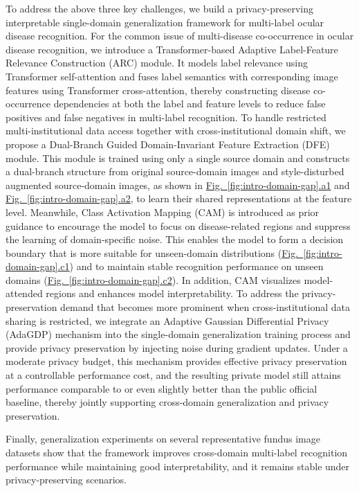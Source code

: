 To address the above three key challenges, we build a privacy-preserving interpretable single-domain generalization framework for multi-label ocular disease recognition. For the common issue of multi-disease co-occurrence in ocular disease recognition, we introduce a Transformer-based Adaptive Label-Feature Relevance Construction (ARC) module. It models label relevance using Transformer self-attention and fuses label semantics with corresponding image features using Transformer cross-attention, thereby constructing disease co-occurrence dependencies at both the label and feature levels to reduce false positives and false negatives in multi-label recognition. To handle restricted multi-institutional data access together with cross-institutional domain shift, we propose a Dual-Branch Guided Domain-Invariant Feature Extraction (DFE) module. This module is trained using only a single source domain and constructs a dual-branch structure from original source-domain images and style-disturbed augmented source-domain images, as shown in \hyperref[fig:intro-domain-gap]{Fig.~\ref*{fig:intro-domain-gap}.a1} and \hyperref[fig:intro-domain-gap]{Fig.~\ref*{fig:intro-domain-gap}.a2}, to learn their shared representations at the feature level. Meanwhile, Class Activation Mapping (CAM) is introduced as prior guidance to encourage the model to focus on disease-related regions and suppress the learning of domain-specific noise. This enables the model to form a decision boundary that is more suitable for unseen-domain distributions (\hyperref[fig:intro-domain-gap]{Fig.~\ref*{fig:intro-domain-gap}.c1}) and to maintain stable recognition performance on unseen domains (\hyperref[fig:intro-domain-gap]{Fig.~\ref*{fig:intro-domain-gap}.c2}). In addition, CAM visualizes model-attended regions and enhances model interpretability. To address the privacy-preservation demand that becomes more prominent when cross-institutional data sharing is restricted, we integrate an Adaptive Gaussian Differential Privacy (AdaGDP) mechanism into the single-domain generalization training process and provide privacy preservation by injecting noise during gradient updates. Under a moderate privacy budget, this mechanism provides effective privacy preservation at a controllable performance cost, and the resulting private model still attains performance comparable to or even slightly better than the public official baseline, thereby jointly supporting cross-domain generalization and privacy preservation.

Finally, generalization experiments on several representative fundus image datasets show that the framework improves cross-domain multi-label recognition performance while maintaining good interpretability, and it remains stable under privacy-preserving scenarios.

